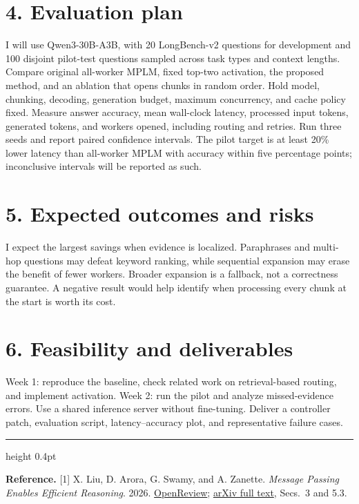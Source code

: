\documentclass[11pt,letterpaper]{article}
\newcommand{\referencesheading}{%
  \par\vspace{4pt}
  {\color{ProposalBlue}\hrule height 0.4pt}
  \vspace{3pt}
}
\begin{document}
\section*{4. Evaluation plan}
I will use Qwen3-30B-A3B, with 20 LongBench-v2 questions for development and 100
disjoint pilot-test questions sampled across task types and context lengths.
Compare original all-worker MPLM, fixed top-two activation, the proposed method,
and an ablation that opens chunks in random order. Hold model, chunking, decoding,
generation budget, maximum concurrency, and cache policy fixed. Measure answer
accuracy, mean wall-clock latency, processed input tokens, generated tokens, and
workers opened, including routing and retries. Run three seeds and report paired
confidence intervals. The pilot target is at least 20\% lower latency than all-worker
MPLM with accuracy within five percentage points; inconclusive intervals will be
reported as such.

\section*{5. Expected outcomes and risks}
I expect the largest savings when evidence is localized. Paraphrases and multi-hop
questions may defeat keyword ranking, while sequential expansion may erase the
benefit of fewer workers. Broader expansion is a fallback, not a correctness
guarantee. A negative result would help identify when processing every chunk at
the start is worth its cost.

\section*{6. Feasibility and deliverables}
Week 1: reproduce the baseline, check related work on retrieval-based routing,
and implement activation. Week 2: run the pilot and analyze missed-evidence errors.
Use a shared inference server without fine-tuning. Deliver a controller patch,
evaluation script, latency--accuracy plot, and representative failure cases.

\vfill
\referencesheading
{\small\textbf{Reference.} [1] X. Liu, D. Arora, G. Swamy, and A. Zanette.
\textit{Message Passing Enables Efficient Reasoning}. 2026.
\href{https://openreview.net/pdf?id=X5TrciQRnV}{OpenReview};
\href{https://arxiv.org/pdf/2607.01077}{arXiv full text}, Secs.~3 and 5.3.\par}
\end{document}
